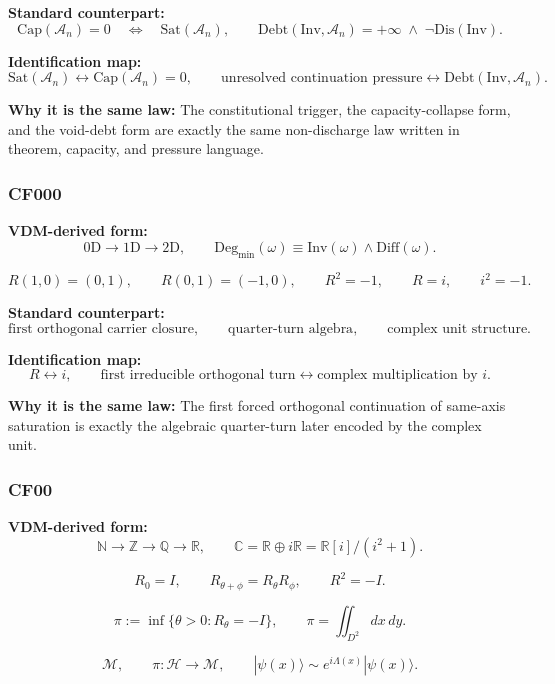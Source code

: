 \documentclass[11pt]{article}
\theoremstyle{definition}
\theoremstyle{plain}
\theoremstyle{remark}
\newcommand{\Inv}{\mathrm{Inv}}
\newcommand{\Sat}{\mathrm{Sat}}
\newcommand{\Dis}{\mathrm{Dis}}
\newcommand{\Debt}{\mathrm{Debt}}
\newcommand{\Diff}{\mathrm{Diff}}
\newcommand{\Deg}{\mathrm{Deg}}
\newcommand{\ArtCap}{\mathrm{Cap}}
\newcommand{\Aclass}{\mathcal{A}}
\begin{document}
\textbf{Standard counterpart:}
\[
\ArtCap(\Aclass_n)=0
\quad\Longleftrightarrow\quad
\Sat(\Aclass_n),
\qquad
\Debt(\Inv,\Aclass_n)=+\infty
\;\wedge\;
\neg\Dis(\Inv).
\]

\textbf{Identification map:}
\[
\Sat(\Aclass_n)
\leftrightarrow
\ArtCap(\Aclass_n)=0,
\qquad
\text{unresolved continuation pressure}
\leftrightarrow
\Debt(\Inv,\Aclass_n).
\]

\textbf{Why it is the same law:} The constitutional trigger, the
capacity-collapse form, and the void-debt form are exactly the same
non-discharge law written in theorem, capacity, and pressure language.


\subsubsection*{CF000}
\textbf{VDM-derived form:}
\[
0\mathrm{D}\to 1\mathrm{D}\to 2\mathrm{D},
\qquad
\Deg_{\min}(\omega)\equiv \Inv(\omega)\wedge \Diff(\omega).
\]

\[
R(1,0)=(0,1),
\qquad
R(0,1)=(-1,0),
\qquad
R^2=-1,
\qquad
R=i,
\qquad
i^2=-1.
\]

\textbf{Standard counterpart:}
\[
\text{first orthogonal carrier closure},
\qquad
\text{quarter-turn algebra},
\qquad
\text{complex unit structure}.
\]

\textbf{Identification map:}
\[
R \leftrightarrow i,
\qquad
\text{first irreducible orthogonal turn}
\leftrightarrow
\text{complex multiplication by }i.
\]

\textbf{Why it is the same law:} The first forced orthogonal continuation of
same-axis saturation is exactly the algebraic quarter-turn later encoded by the
complex unit.


\subsubsection*{CF00}
\textbf{VDM-derived form:}
\[
\mathbb{N}\to \mathbb{Z}\to \mathbb{Q}\to \mathbb{R},
\qquad
\mathbb{C}=\mathbb{R}\oplus i\mathbb{R}
=
\mathbb{R}[i]/(i^2+1).
\]

\[
R_0=I,
\qquad
R_{\theta+\phi}=R_\theta R_\phi,
\qquad
R^2=-I.
\]

\[
\pi := \inf\{\theta>0:R_\theta=-I\},
\qquad
\pi=\iint_{D^2}dx\,dy.
\]

\[
\mathcal{M},
\qquad
\pi:\mathcal{H}\to \mathcal{M},
\qquad
|\psi(x)\rangle \sim e^{i\Lambda(x)}|\psi(x)\rangle.
\]
\end{document}
